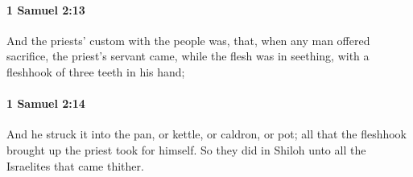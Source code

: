 		\paragraph{1 Samuel 2:13} %
			\label{1SAMUEL-2-13}

			And the priests’ custom with the people was, that, when any man offered sacrifice, the priest’s servant came, while the flesh was in seething, with a fleshhook of three teeth in his hand;


		\paragraph{1 Samuel 2:14} %
			\label{1SAMUEL-2-14}

			And he struck it into the pan, or kettle, or caldron, or pot; all that the fleshhook brought up the priest took for himself. So they did in Shiloh unto all the Israelites that came thither.


